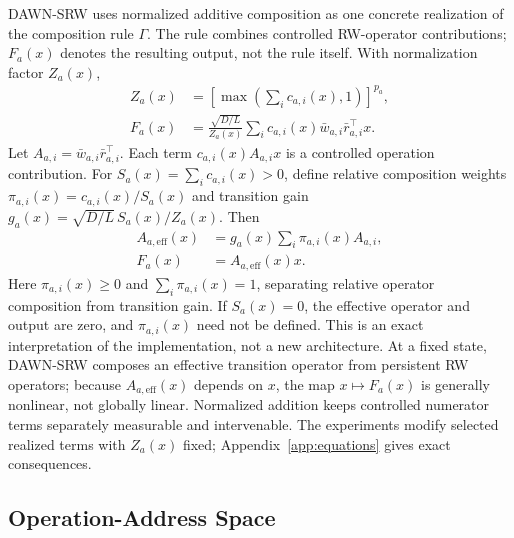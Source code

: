 \documentclass{article}
\newcommand{\DAWN}{DAWN-SRW}
\begin{document}
\DAWN{} uses normalized additive composition as one concrete realization of the
composition rule \(\Gamma\). The rule combines controlled RW-operator
contributions; \(F_a(x)\) denotes the resulting output, not the rule itself.
With normalization factor \(Z_a(x)\),
\begin{align}
Z_a(x)&=\left[\max\!\left(\sum_i c_{a,i}(x),1\right)\right]^{p_a},\\
F_a(x)&=\frac{\sqrt{D/L}}{Z_a(x)}
\sum_i c_{a,i}(x)\bar w_{a,i}\bar r_{a,i}^{\top}x.
\label{eq:implemented_composition}
\end{align}
Let \(A_{a,i}=\bar w_{a,i}\bar r_{a,i}^{\top}\). Each term
\(c_{a,i}(x)A_{a,i}x\) is a controlled operation contribution. For
\(S_a(x)=\sum_i c_{a,i}(x)>0\), define relative composition weights
\(\pi_{a,i}(x)=c_{a,i}(x)/S_a(x)\) and transition gain
\(g_a(x)=\sqrt{D/L}\,S_a(x)/Z_a(x)\). Then
\begin{equation*}
\begin{aligned}
A_{a,\mathrm{eff}}(x)&=g_a(x)\sum_i\pi_{a,i}(x)A_{a,i},\\
F_a(x)&=A_{a,\mathrm{eff}}(x)x.
\end{aligned}
\end{equation*}
Here \(\pi_{a,i}(x)\geq0\) and \(\sum_i\pi_{a,i}(x)=1\), separating relative
operator composition from transition gain. If \(S_a(x)=0\), the effective
operator and output are zero, and \(\pi_{a,i}(x)\) need not be defined. This is
an exact interpretation of the implementation, not a new architecture.
At a fixed state, \DAWN{} composes an effective transition operator from
persistent RW operators; because \(A_{a,\mathrm{eff}}(x)\) depends on \(x\),
the map \(x\mapsto F_a(x)\) is generally nonlinear, not globally linear.
Normalized addition keeps controlled numerator terms separately measurable and
intervenable. The experiments modify selected realized terms with \(Z_a(x)\)
fixed; Appendix~\ref{app:equations} gives exact consequences.

\subsection{Operation-Address Space}
\label{sec:operation-space}
\end{document}
